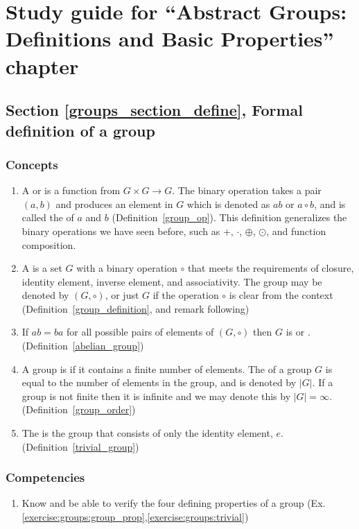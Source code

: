\section{Study guide  for ``Abstract Groups: Definitions and Basic Properties''  chapter}\label{sec:groups:study} 


\subsection*{Section \ref{groups_section_define}, Formal definition of a group}
\subsubsection*{Concepts}
\begin{enumerate}
\item %
A  or  is a function from $G \times G \rightarrow G$. The binary operation takes a pair $(a,b)$ and produces an element in $G$ which is denoted as $ab$ or $a \circ b$, and is  called the  of $a$ and $b$ (Definition~\ref{group_op}). This definition generalizes the binary operations we have seen before, such as +, $\cdot$, $\oplus$, $\odot$, and function composition.
\item
A  is a set $G$ with a binary operation $\circ$ that meets the requirements of closure, identity element, inverse element, and associativity. The group may be denoted by $(G,\circ)$, or just $G$ if the operation $\circ$ is clear from the context  (Definition~\ref{group_definition}, and remark following)
\item
If $ab=ba$ for all possible pairs of elements of $(G, \circ)$ then $G$ is  or . (Definition~\ref{abelian_group})
\item
 A group is   if it contains a finite number of elements.  The  of a group $G$ is equal to the number of elements in the group, and is denoted by $|G|$. If a group is not finite then it is infinite and we may denote this by $|G| = \infty$. (Definition~\ref{group_order})
\item
The  is the group that consists of only the identity element, $e$. (Definition~\ref{trivial_group})
\end{enumerate}

\subsubsection*{Competencies}
\begin{enumerate}
\item
Know and be able to verify the four defining properties of a group (Ex. \ref{exercise:groups:group_prop},\ref{exercise:groups:trivial})
\end{enumerate}


